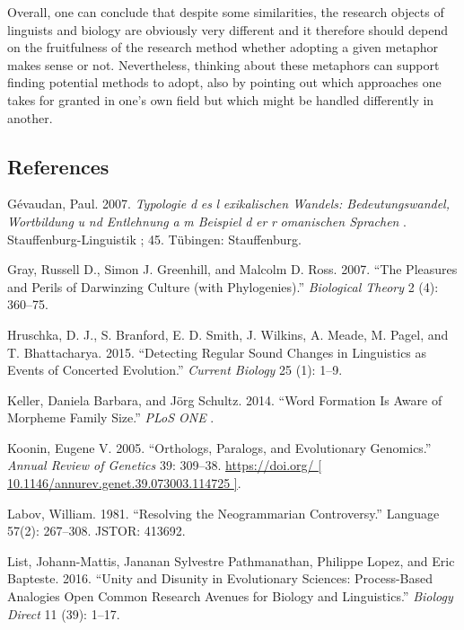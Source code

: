 \documentclass[
  a4paper,
  14pt,
  oneside,
  tablecaptionabove
]{scrbook}
\begin{document}
Overall, one can conclude that despite some similarities, the research
objects of linguists and biology are obviously very different and it
therefore should depend on the fruitfulness of the research method
whether adopting a given metaphor makes sense or not. Nevertheless,
thinking about these metaphors can support finding potential methods to
adopt, also by pointing out which approaches one takes for granted in
one's own field but which might be handled differently in another.

\subsection*{References}

\nopagebreak\hangindent=0.7cm {\small Gévaudan, Paul. 2007. \emph{Typologie} \emph{d} \emph{es} \emph{l}
\emph{exikalischen Wandels: Bedeutungswandel, Wortbildung} \emph{u}
\emph{nd Entlehnung} \emph{a} \emph{m Beispiel} \emph{d} \emph{er}
\emph{r} \emph{omanischen Sprachen} . Stauffenburg-Linguistik ; 45.
Tübingen: Stauffenburg. }

\nopagebreak\hangindent=0.7cm {\small Gray, Russell D., Simon J. Greenhill, and Malcolm D. Ross. 2007.
\enquote{The Pleasures and Perils of Darwinzing Culture (with
Phylogenies).} \emph{Biological Theory} 2 (4): 360--75. }

\nopagebreak\hangindent=0.7cm {\small Hruschka, D. J., S. Branford, E. D. Smith, J. Wilkins, A. Meade, M.
Pagel, and T. Bhattacharya. 2015. \enquote{Detecting Regular Sound
Changes in Linguistics as Events of Concerted Evolution.} \emph{Current
Biology} 25 (1): 1--9. }

\nopagebreak\hangindent=0.7cm {\small Keller, Daniela Barbara, and Jörg Schultz. 2014. \enquote{Word
Formation Is Aware of Morpheme Family Size.} \emph{PLoS ONE} . }

\nopagebreak\hangindent=0.7cm {\small Koonin, Eugene V. 2005. \enquote{Orthologs, Paralogs, and
Evolutionary Genomics.} \emph{Annual Review of Genetics} 39: 309--38.
\href{https://doi.org/10.1146/annurev.genet.39.073003.114725}{https://doi.org/
{[} 10.1146/annurev.genet.39.073003.114725 {]}}. }

\nopagebreak\hangindent=0.7cm {\small Labov, William. 1981. \enquote{Resolving the Neogrammarian
Controversy.} Language 57(2): 267--308. JSTOR: 413692. }

\nopagebreak\hangindent=0.7cm {\small List, Johann-Mattis, Jananan Sylvestre Pathmanathan, Philippe Lopez,
and Eric Bapteste. 2016. \enquote{Unity and Disunity in Evolutionary
Sciences: Process-Based Analogies Open Common Research Avenues for
Biology and Linguistics.} \emph{Biology Direct} 11 (39): 1--17. }
\end{document}
